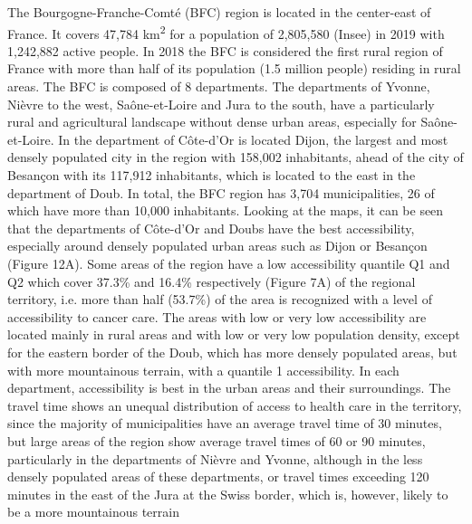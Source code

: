 The Bourgogne-Franche-Comté (BFC) region is located in the center-east of
France. It covers 47,784 km\textsuperscript{2} for a population of 2,805,580
(Insee) in 2019 with 1,242,882 active people. In 2018 the BFC is considered the
first rural region of France with more than half of its population (1.5 million
people) residing in rural areas. The BFC is composed of 8 departments. The
departments of Yvonne, Nièvre to the west, Saône-et-Loire and Jura to the south,
have a particularly rural and agricultural landscape without dense urban areas,
especially for Saône-et-Loire.  In the department of Côte-d'Or is located Dijon,
the largest and most densely populated city in the region with 158,002
inhabitants, ahead of the city of Besançon with its 117,912 inhabitants, which
is located to the east in the department of Doub. In total, the BFC region has
3,704 municipalities, 26 of which have more than 10,000 inhabitants. Looking at
the maps, it can be seen that the departments of Côte-d'Or and Doubs have the
best accessibility, especially around densely populated urban areas such as
Dijon or Besançon (Figure 12A). Some areas of the region have a low
accessibility quantile Q1 and Q2 which cover 37.3\% and 16.4\% respectively
(Figure 7A) of the regional territory, i.e. more than half (53.7\%) of the area
is recognized with a level of accessibility to cancer care. The areas with low
or very low accessibility are located mainly in rural areas and with low or very
low population density, except for the eastern border of the Doub, which has
more densely populated areas, but with more mountainous terrain, with a quantile
1 accessibility. In each department, accessibility is best in the urban areas
and their surroundings. The travel time shows an unequal distribution of access
to health care in the territory, since the majority of municipalities have an
average travel time of 30 minutes, but large areas of the region show average
travel times of 60 or 90 minutes, particularly in the departments of Nièvre and
Yvonne, although in the less densely populated areas of these departments, or
travel times exceeding 120 minutes in the east of the Jura at the Swiss border,
which is, however, likely to be a more mountainous terrain

